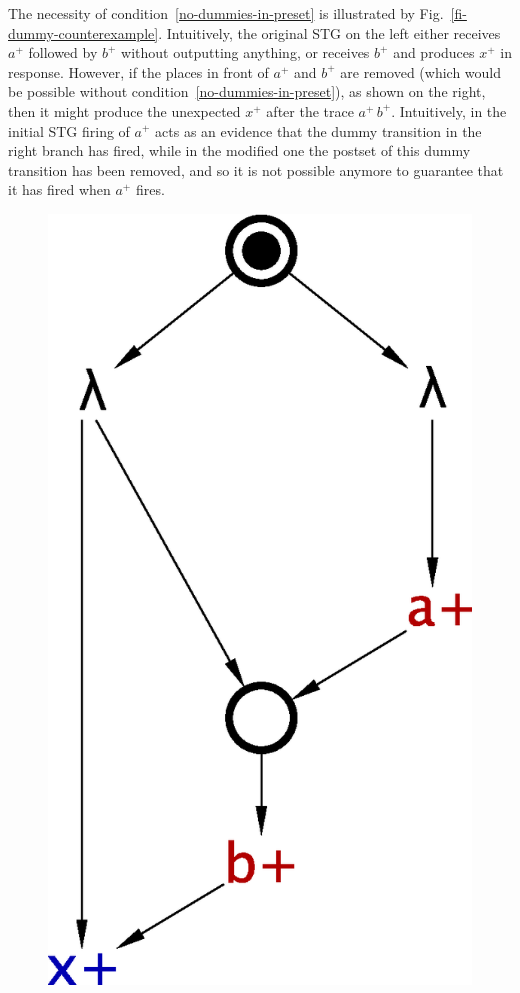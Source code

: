 The necessity of condition~\ref{no-dummies-in-preset} is
illustrated by Fig.~\ref{fi-dummy-counterexample}. Intuitively,
the original STG on the left either receives $a^+$ followed by
$b^+$ without outputting anything, or receives $b^+$ and
produces $x^+$ in response. However, if the places in front of
$a^+$ and $b^+$ are removed (which would be possible without
condition~\ref{no-dummies-in-preset}), as shown on the right,
then it might produce the unexpected $x^+$ after the trace
$a^+\,b^+$. Intuitively, in the initial STG firing of $a^+$
acts as an evidence that the dummy transition in the right
branch has fired, while in the modified one the postset of this
dummy transition has been removed, and so it is not possible
anymore to guarantee that it has fired when $a^+$ fires.

\begin{figure}[!tb]
    \centering
    {}%
    \hfill%
    \includegraphics[scale=0.3]{EXPERIMENTS/stg/dummy_counterexample}%

\end{figure}
